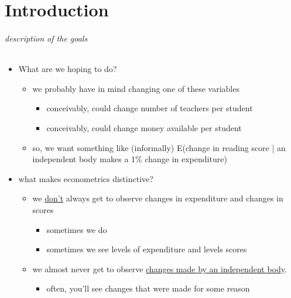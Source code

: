 

\part*{Introduction}%

\paragraph{description of the goals}
\begin{itemize}
\item What are we hoping to do?
\begin{itemize}
\item we probably have in mind changing one of these variables
\begin{itemize}
\item conceivably, could change number of teachers per student
\item conceivably, could change money available per student
\end{itemize}
\item so, we want something like (informally) E(change in reading
          score | an independent body makes a 1\% change in expenditure)
\end{itemize}
\item what makes econometrics distinctive?
\begin{itemize}
\item we \underline{don't} always get to observe changes in expenditure and
          changes in scores
\begin{itemize}
\item sometimes we do
\item sometimes we see levels of expenditure and levels scores
\end{itemize}
\item we almost never get to observe \underline{changes made by an independent           body}.
\begin{itemize}
\item often, you'll see changes that were made for some reason
\end{itemize}
\end{itemize}
\end{itemize}

